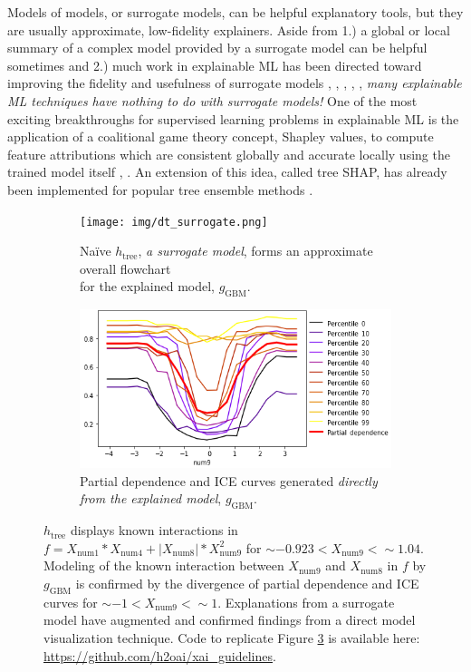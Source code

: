 \documentclass[sigconf]{acmart}
\begin{document}
Models of models, or surrogate models, can be helpful explanatory tools, but they are usually approximate, low-fidelity explainers. Aside from 1.) a global or local summary of a complex model provided by a surrogate model can be helpful sometimes and 2.) much work in explainable ML has been directed toward improving the fidelity and usefulness of surrogate models \cite{dt_surrogate2}, \cite{viper}, \cite{dt_surrogate1}, \cite{lime-sup}, \cite{wf_xnn}, \textit{many explainable ML techniques have nothing to do with surrogate models!} One of the most exciting breakthroughs for supervised learning problems in explainable ML is the application of a coalitional game theory concept, Shapley values, to compute feature attributions which are consistent globally and accurate locally using the trained model itself \cite{shapley}, \cite{kononenko2010efficient}. An extension of this idea, called tree SHAP, has already been implemented for popular tree ensemble methods \cite{tree_shap}. 

\begin{figure}[htb!]
	\begin{subfigure}{.55\textwidth}	\centering
		\texttt{[image: img/dt\_surrogate.png]}
  		\caption{Na\"ive $h_{\text{tree}}$, \textit{a surrogate model}, forms an approximate overall flowchart\\ for the explained model, $g_{\text{GBM}}$.}
  		\label{fig:dt_surrogate}
	\end{subfigure}\hfill
	\begin{subfigure}{.45\textwidth}	\centering
  		\includegraphics[height=0.4\linewidth, width=0.75\linewidth]{img/pdp_ice.png}
  		\caption{Partial dependence and ICE curves generated \textit{directly from the explained model}, $g_{\text{GBM}}$.}
  		\label{fig:pdp_ice}
	\end{subfigure} \vspace{-5pt}
	\caption{$h_{\text{tree}}$ displays known interactions in $f = X_{\text{num}1} * X_{\text{num}4} + |X_{\text{num}8}| * X_{\text{num}9}^2$ for $\sim -0.923 < X_{\text{num9}} <  \sim 1.04$. Modeling of the known interaction between $X_{\text{num9}}$ and $X_{\text{num8}}$ in $f$ by $g_{\text{GBM}}$ is confirmed by the divergence of partial dependence and ICE curves for $\sim -1 < X_{\text{num9}} <  \sim 1$. Explanations from a surrogate model have augmented and confirmed findings from a direct model visualization technique. Code to replicate Figure \ref{fig:pdp_ice_dt_surrogate} is available here: \url{https://github.com/h2oai/xai_guidelines}.}
	\label{fig:pdp_ice_dt_surrogate}
\end{figure}
\end{document}

